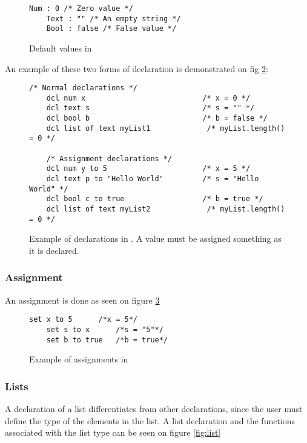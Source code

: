 \begin{figure}[H]
    \centering
    \begin{lstlisting}[style=gglang]
    Num : 0 /* Zero value */
    Text : "" /* An empty string */
    Bool : false /* False value */
    \end{lstlisting}
    \caption{Default values in \lang{}}\label{fig:defaultdcl}
\end{figure}

An example of these two forms of declaration is demonstrated on fig \ref{fig:dclEx}:

\begin{figure}[H]
    \centering
    \begin{lstlisting}[style=gglang]
    /* Normal declarations */
    dcl num x                           /* x = 0 */
    dcl text s                          /* s = "" */
    dcl bool b                          /* b = false */
    dcl list of text myList1             /* myList.length() = 0 */
    
    /* Assignment declarations */
    dcl num y to 5                      /* x = 5 */
    dcl text p to "Hello World"         /* s = "Hello World" */
    dcl bool c to true                  /* b = true */
    dcl list of text myList2             /* myList.length() = 0 */
    \end{lstlisting}
    \caption{Example of declarations in \lang{}. A value must be assigned something as it is declared.}
    \label{fig:dclEx}
\end{figure}

\subsubsection{Assignment}
An assignment is done as seen on figure \ref{fig:ass}
\begin{figure}[H]
    \centering
    \begin{lstlisting}[style=gglang]
    set x to 5      /*x = 5*/
    set s to x      /*s = "5"*/
    set b to true   /*b = true*/
    \end{lstlisting}
    \caption{Example of assignments in \lang{}}\label{fig:ass}
\end{figure}

\subsubsection{Lists}
A declaration of a list differentiates from other declarations, since the user must define the type of the elements in the list. A list declaration and the functions associated with the list type can be seen on figure \ref{fig:list}


